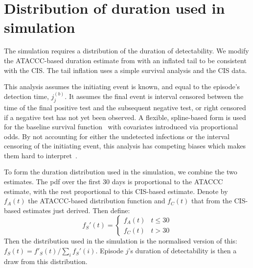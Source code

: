 \documentclass[12pt]{article}
\begin{document}
\section{Distribution of duration used in simulation} \label{sec:simulation-truth}

The simulation requires a distribution of the duration of detectability.
We modify the ATACCC-based duration estimate from \citet[chapter 4]{blakeThesis} with an inflated tail to be consistent with the CIS.
The tail inflation uses a simple survival analysis and the CIS data.

This analysis assumes the initiating event is known, and equal to the episode’s detection time, $j_j^{(b)}$.
It assumes the final event is interval censored between the time of the final positive test and the subsequent negative test, or right censored if a negative test has not yet been observed.
A flexible, spline-based form is used for the baseline survival function~\citep{roystonSTPM,roystonFlexible} with covariates introduced via proportional odds.
By not accounting for either the undetected infections or the interval censoring of the initiating event, this analysis has competing biases which makes them hard to interpret~\citep{cisMethodsONS}.

To form the duration distribution used in the simulation, we combine the two estimates.
The pdf over the first 30 days is proportional to the ATACCC estimate, with the rest proportional to this CIS-based estimate.
Denote by $f_A(t)$ the ATACCC-based distribution function and $f_C(t)$ that from the CIS-based estimates just derived.
Then define:
$$
f_S'(t) = \begin{cases}
	f_A(t) &t \leq 30 \\
	f_C(t) &t > 30
\end{cases}
$$
Then the distribution used in the simulation is the normalised version of this: $f_S(t) = f'_S(t)/\sum_i f_S'(i)$.
Episode $j$'s duration of detectability is then a draw from this distribution.
\end{document}
